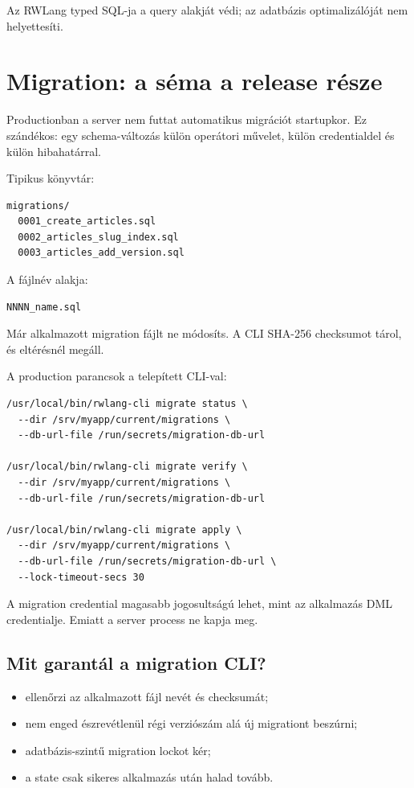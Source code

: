 Az RWLang typed SQL-ja a query alakját védi; az adatbázis optimalizálóját nem helyettesíti.

\section{Migration: a séma a release része}

Productionban a server nem futtat automatikus migrációt startupkor. Ez szándékos: egy schema-változás külön operátori művelet, külön credentialdel és külön hibahatárral.

Tipikus könyvtár:

\begin{lstlisting}
migrations/
  0001_create_articles.sql
  0002_articles_slug_index.sql
  0003_articles_add_version.sql
\end{lstlisting}

A fájlnév alakja:

\begin{lstlisting}
NNNN_name.sql
\end{lstlisting}

Már alkalmazott migration fájlt ne módosíts. A CLI SHA-256 checksumot tárol, és eltérésnél megáll.

A production parancsok a telepített CLI-val:

\begin{lstlisting}
/usr/local/bin/rwlang-cli migrate status \
  --dir /srv/myapp/current/migrations \
  --db-url-file /run/secrets/migration-db-url

/usr/local/bin/rwlang-cli migrate verify \
  --dir /srv/myapp/current/migrations \
  --db-url-file /run/secrets/migration-db-url

/usr/local/bin/rwlang-cli migrate apply \
  --dir /srv/myapp/current/migrations \
  --db-url-file /run/secrets/migration-db-url \
  --lock-timeout-secs 30
\end{lstlisting}

A migration credential magasabb jogosultságú lehet, mint az alkalmazás DML credentialje. Emiatt a server process ne kapja meg.

\subsection*{Mit garantál a migration CLI?}

\begin{itemize}
\item ellenőrzi az alkalmazott fájl nevét és checksumát;
\item nem enged észrevétlenül régi verziószám alá új migrationt beszúrni;
\item adatbázis-szintű migration lockot kér;
\item a state csak sikeres alkalmazás után halad tovább.
\end{itemize}

